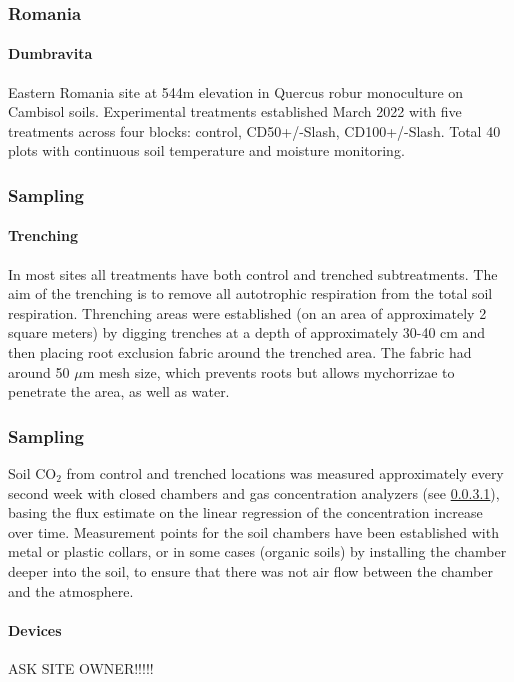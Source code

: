 \documentclass[12pt,a4paper]{article}
\begin{document}
\subsubsection{Romania}
\paragraph{Dumbravita} Eastern Romania site at 544m elevation in Quercus robur monoculture on Cambisol soils. Experimental treatments established March 2022 with five treatments across four blocks: control, CD50+/-Slash, CD100+/-Slash. Total 40 plots with continuous soil temperature and moisture monitoring.


\subsubsection{Sampling}

\paragraph{Trenching}
In most sites all treatments have both control and trenched subtreatments. The aim of the trenching is to remove all autotrophic respiration from the total soil respiration. Threnching areas were established (on an area of approximately 2 square meters) by digging trenches at a depth of approximately 30-40 cm and then placing root exclusion fabric around the trenched area. The fabric had around 50 $\mu$m mesh size, which prevents roots but allows mychorrizae to penetrate the area, as well as water.

\subsubsection{Sampling}
Soil CO$_2$ from control and trenched locations was measured approximately every second week with closed chambers and gas concentration analyzers (see \ref{par:devices}), basing the flux estimate on the linear regression of the concentration increase over time.
Measurement points for the soil chambers have been established with metal or plastic collars, or in some cases (organic soils) by installing the chamber deeper into the soil, to ensure that there was not air flow between the chamber and the atmosphere.

\paragraph{Devices}\label{par:devices}
ASK SITE OWNER!!!!!
\end{document}
